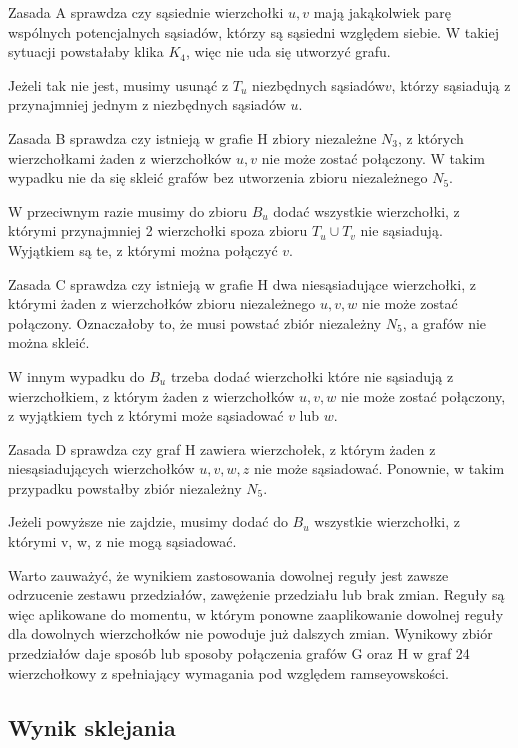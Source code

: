 Zasada A sprawdza czy sąsiednie wierzchołki $u, v$ mają jakąkolwiek parę wspólnych potencjalnych sąsiadów, którzy są sąsiedni względem siebie.
W takiej sytuacji powstałaby klika $K_4$, więc nie uda się utworzyć grafu. \par

Jeżeli tak nie jest, musimy usunąć z $T_u$ niezbędnych sąsiadów$ v$, 
którzy sąsiadują z przynajmniej jednym z niezbędnych sąsiadów $u$. 

Zasada B sprawdza czy istnieją w grafie H zbiory niezależne $N_3$, z których wierzchołkami żaden z wierzchołków $u, v $ nie może zostać połączony. W takim wypadku nie da się skleić grafów bez utworzenia zbioru niezależnego $N_5$. 

W przeciwnym razie musimy do zbioru $B_u$ dodać wszystkie wierzchołki, 
z którymi przynajmniej 2 wierzchołki spoza zbioru $T_u \cup T_v$ nie sąsiadują. Wyjątkiem są te, z którymi można połączyć $v$. \par

Zasada C sprawdza czy istnieją w grafie H dwa niesąsiadujące wierzchołki, z którymi żaden z wierzchołków zbioru niezależnego $u, v, w$ nie może zostać połączony. 
Oznaczałoby to, że musi powstać zbiór niezależny $N_5$, a grafów nie można skleić.


W innym wypadku do $B_u$ trzeba dodać wierzchołki które nie sąsiadują z wierzchołkiem, 
z którym żaden z wierzchołków $u, v, w$ nie może zostać połączony, z wyjątkiem tych z którymi może sąsiadować $v$ lub $w$.  \par

Zasada D sprawdza czy graf H zawiera wierzchołek, z którym żaden z niesąsiadujących wierzchołków $u, v, w, z$
nie może sąsiadować. Ponownie, w takim przypadku powstałby zbiór niezależny $N_5$.

Jeżeli powyższe nie zajdzie, musimy dodać do $B_u$ wszystkie wierzchołki, z którymi v, w, z nie mogą sąsiadować. \par


Warto zauważyć, że wynikiem zastosowania dowolnej reguły jest zawsze odrzucenie zestawu przedziałów, zawężenie przedziału lub brak zmian. Reguły są więc aplikowane do momentu, w którym ponowne zaaplikowanie dowolnej reguły dla dowolnych wierzchołków nie powoduje już dalszych zmian. Wynikowy zbiór przedziałów daje sposób lub sposoby połączenia grafów G oraz H w graf 24 wierzchołkowy z spełniający wymagania pod względem ramseyowskości.

\subsection{Wynik sklejania}

